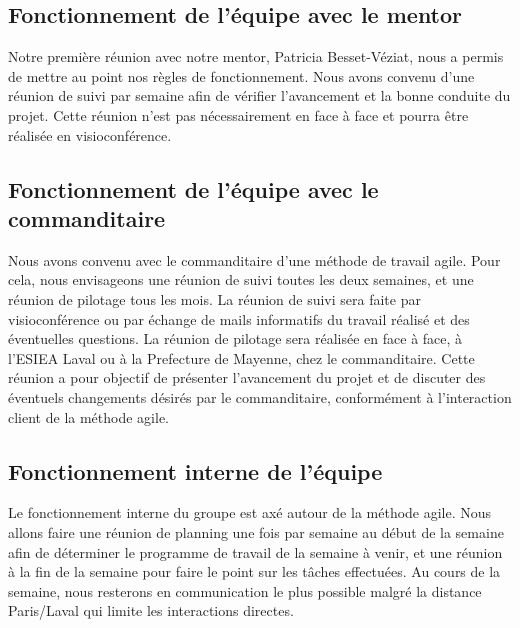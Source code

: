 \subsection{Fonctionnement de l'équipe avec le mentor}
Notre première réunion avec notre mentor, Patricia Besset-Véziat, nous a permis de mettre au point nos règles de fonctionnement.
Nous avons convenu d'une réunion de suivi par semaine afin de vérifier l'avancement et la bonne conduite du projet.
Cette réunion n'est pas nécessairement en face à face et pourra être réalisée en visioconférence.


\subsection{Fonctionnement de l'équipe avec le commanditaire}
Nous avons convenu avec le commanditaire d'une méthode de travail agile.
Pour cela, nous envisageons une réunion de suivi toutes les deux semaines, et une réunion de pilotage tous les mois.
La réunion de suivi sera faite par visioconférence ou par échange de mails informatifs du travail réalisé et des éventuelles questions.
La réunion de pilotage sera réalisée en face à face, à l'ESIEA Laval ou à la Prefecture de Mayenne, chez le commanditaire.
Cette réunion a pour objectif de présenter l'avancement du projet et de discuter des éventuels changements désirés par le commanditaire, conformément à l'interaction client de la méthode agile.


\subsection{Fonctionnement interne de l'équipe}
Le fonctionnement interne du groupe est axé autour de la méthode agile.
Nous allons faire une réunion de planning une fois par semaine au début de la semaine afin de déterminer le programme de travail de la semaine à venir, et une réunion à la fin de la semaine pour faire le point sur les tâches effectuées.
Au cours de la semaine, nous resterons en communication le plus possible malgré la distance Paris/Laval qui limite les interactions directes.


